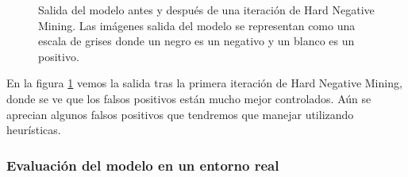 \begin{figure}\centering
  \par
  \hfill
  \caption{Salida del modelo antes y después de una iteración de Hard Negative Mining. Las imágenes salida del modelo se representan como una escala de grises donde un negro es un negativo y un blanco es un positivo.}
  \label{fig:hnmining}
\end{figure}

En la figura \ref{fig:hnmining} vemos la salida tras la primera iteración de Hard Negative Mining, donde se ve que los falsos positivos están mucho mejor controlados. Aún se aprecian algunos falsos positivos que tendremos que manejar utilizando heurísticas.

\subsubsection*{Evaluación del modelo en un entorno real}


